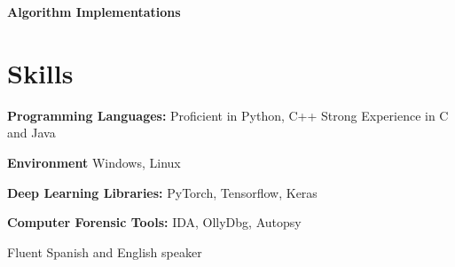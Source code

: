 \documentclass[12pt,a4paper,roman]{moderncv}        %
\makeatletter
\renewcommand*{\bibliographyitemlabel}{\@biblabel{\arabic{enumiv}}}
\makeatother
\begin{document}
\textbf{Algorithm Implementations}\\

\section{Skills}

\textbf{Programming Languages:} Proficient in Python, C++ Strong Experience in C and Java
\vspace{2pt}

\textbf{Environment} Windows, Linux
\vspace{2pt}
	
\textbf{Deep Learning Libraries:} PyTorch, Tensorflow, Keras
\vspace{2pt}
	
\textbf{Computer Forensic Tools:} IDA, OllyDbg, Autopsy
\vspace{2pt}
	
Fluent Spanish and English speaker
\vspace{2pt}

\nocite{*}



\end{document}
